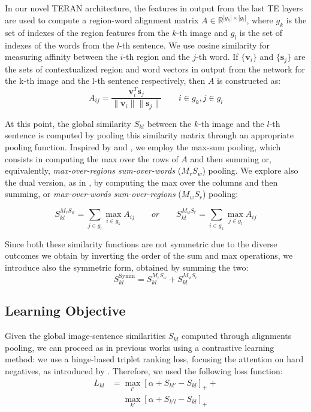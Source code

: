 \documentclass[acmsmall]{acmart}
\begin{document}
In our novel TERAN architecture, the features in output from the last TE layers are used to compute a region-word alignment matrix $A \in \mathbb{R}^{|g_k| \times |g_l|}$, where $g_k$ is the set of indexes of the region features from the $k$-th image and $g_l$ is the set of indexes of the words from the $l$-th sentence. We use cosine similarity for measuring affinity between the $i$-th region and the $j$-th word. If $\{\boldsymbol{v}_i\}$ and $\{\boldsymbol{s}_j\}$ are the sets of contextualized region and word vectors in output from the network for the k-th image and the l-th sentence respectively, then $A$ is constructed as:
\begin{equation}
    A_{ij} = \frac{\boldsymbol{v}_i^T \boldsymbol{s}_j}{\| \boldsymbol{v}_i \| \| \boldsymbol{s}_j \|} \qquad i \in g_k, j \in g_l
\end{equation}

At this point, the global similarity $S_{kl}$ between the $k$-th image and the $l$-th sentence is computed by pooling this similarity matrix through an appropriate pooling function. Inspired by \cite{karpathy2015alignment} and \cite{lee2018stackedcrossattention}, we employ the max-sum pooling, which consists in computing the max over the rows of $A$ and then summing or, equivalently, \textit{max-over-regions sum-over-words} ($M_{r}S_{w}$) pooling. We explore also the dual version, as in \cite{lee2018stackedcrossattention}, by computing the max over the columns and then summing, or \textit{max-over-words sum-over-regions} ($M_{w}S_{r}$) pooling:

\begin{equation}
    S^{M_{r}S_{w}}_{kl} = \sum_{j \in g_l}\max_{i \in g_k} {A_{ij}} \qquad or \qquad S^{M_{w}S_{r}}_{kl} = \sum_{i \in g_k}\max_{j \in g_l} {A_{ij}}
\end{equation}

Since both these similarity functions are not symmetric due to the diverse outcomes we obtain by inverting the order of the sum and max operations, we introduce also the symmetric form, obtained by summing the two:
\begin{equation}
    S^{\text{Symm}}_{kl} = S^{M_{r}S_{w}}_{kl} + S^{M_{w}S_{r}}_{kl}
\end{equation}

\subsection{Learning Objective}
Given the global image-sentence similarities $S_{kl}$ computed through alignments pooling, we can proceed as in previous works \cite{vsepp2018faghri,li2019} using a contrastive learning method: we use a hinge-based triplet ranking loss, focusing the attention on hard negatives, as introduced by \cite{vsepp2018faghri}.
Therefore, we used the following loss function:
\begin{equation}
\begin{split}
    L_{kl} &= \max_{{l}'} [\alpha + S_{kl'} - S_{kl}]_+ + \\
    &\mathrel{\phantom{=}} \max_{{k}'} [\alpha + S_{k'l} - S_{kl}]_+
\end{split}
\end{equation}
\end{document}
